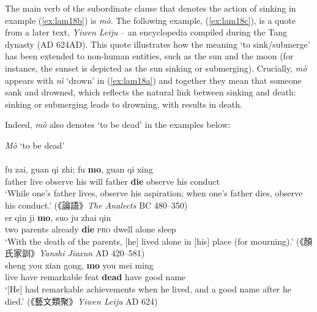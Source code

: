 \documentclass[output=paper]{langscibook}
\begin{document}
The main verb of the subordinate clause that denotes the action of sinking in example (\ref{ex:lam18b}) is \textit{mò}. The following example, (\ref{ex:lam18c}), is a quote from a later text, \emph{Yiwen Leiju} – an encyclopedia compiled during the Tang dynasty (AD 624AD). This quote illustrates how the meaning `to sink/submerge' has been extended to non-human entities, such as the sun and the moon (for instance, the sunset is depicted as the sun sinking or submerging). Crucially, \textit{mò} appears with \textit{nì} `drown' in (\ref{ex:lam18a}) and together they mean that someone sank and drowned, which reflects the natural link between sinking and death: sinking or submerging leads to drowning, with results in death. 

Indeed, \textit{mò} also denotes `to be dead' in the examples below: 

\ea \textit{Mò} `to be dead'  \label{ex:lam19}\\
  \\
  	\gll fu zai, guan qi zhi; fu \textbf{mo}, guan qi xing\\
  	father live observe	his	will father	\textbf{die} observe his	conduct\\
  	\glt `While one's father lives, observe his aspiration; when one's father dies, observe his conduct.' ({\cn 《論語》}\emph{The Analects} BC 480–350)
   \label{ex:lam19b}\\
  	\gll er	qin	ji \textbf{mo}, suo ju zhai qin\\
  	two	parents	already	\textbf{die} \textsc{pro} dwell alone	sleep\\
  	\glt `With the death of the parents, [he] lived alone in [his] place (for mourning).' ({\cn 《顏氏家訓》}\emph{Yanshi Jiaxun} AD 420–581)
  \label{ex:lam19c}\\
	\gll sheng you xian gong, \textbf{mo} you mei ming\\ 
	live have remarkable feat \textbf{dead} have	good name\\
	\glt `[He] had remarkable achievements when he lived, and a good name after he died.' ({\cn 《藝文類聚》}\emph{Yiwen Leiju} AD 624)
\z \z
\end{document}
